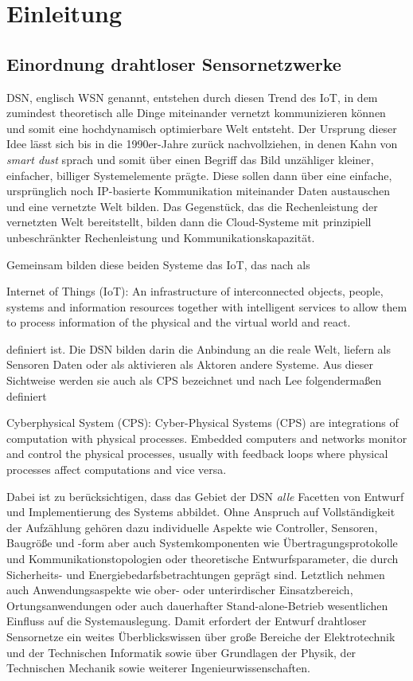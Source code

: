\thispagestyle{plain}
\chapter{Einleitung}
\section{Einordnung drahtloser Sensornetzwerke}

\ac{DSN}, englisch \ac{WSN} genannt, entstehen durch diesen Trend des \ac{IoT}, in dem zumindest theoretisch alle Dinge miteinander vernetzt kommunizieren können und somit eine hochdynamisch optimierbare Welt entsteht. Der Ursprung dieser Idee lässt sich bis in die 1990er-Jahre zurück nachvollziehen, in denen Kahn \parencite{Kahn1999} von \emph{smart dust} sprach und somit über einen Begriff das Bild unzähliger kleiner, einfacher, billiger Systemelemente prägte. Diese sollen dann über eine einfache, ursprünglich noch \ac{IP}-basierte Kommunikation miteinander Daten austauschen und eine vernetzte Welt bilden. Das Gegenstück, das die Rechenleistung der vernetzten Welt bereitstellt, bilden dann die Cloud-Systeme mit prinzipiell unbeschränkter Rechenleistung und Kommunikationskapazität.

Gemeinsam bilden diese beiden Systeme das \ac{IoT}, das nach \textcite{InternationalOrganizationforStandardization1997} als 

Internet of Things (IoT):
An infrastructure of interconnected objects, people, systems and information resources together with intelligent services to allow them to process information of the physical and the virtual world and react.

definiert ist. Die \ac{DSN} bilden darin die Anbindung an die reale Welt, liefern als Sensoren Daten oder als aktivieren als Aktoren andere Systeme. Aus dieser Sichtweise werden sie auch als \ac{CPS} bezeichnet und nach Lee \parencite{Lee2008} folgendermaßen definiert

Cyberphysical System (CPS): Cyber-Physical Systems (CPS) are integrations of computation with physical processes. Embedded computers and networks monitor and control the physical processes, usually with feedback loops where physical processes affect computations and vice versa.

Dabei ist zu berücksichtigen, dass das Gebiet der \ac{DSN} \emph{alle} Facetten von Entwurf und Implementierung des Systems abbildet. Ohne Anspruch auf Vollständigkeit der Aufzählung gehören dazu individuelle Aspekte wie Controller, Sensoren, Baugröße und -form aber auch Systemkomponenten wie Übertragungsprotokolle und Kommunikationstopologien oder theoretische Entwurfsparameter, die durch Sicherheits- und Energiebedarfsbetrachtungen geprägt sind. Letztlich nehmen auch Anwendungsaspekte wie ober- oder unterirdischer Einsatzbereich, Ortungsanwendungen oder auch dauerhafter Stand-alone-Betrieb wesentlichen Einfluss auf die Systemauslegung. Damit erfordert der Entwurf drahtloser Sensornetze ein weites Überblickswissen über große Bereiche der Elektrotechnik und der Technischen Informatik sowie über Grundlagen der Physik, der Technischen Mechanik sowie weiterer Ingenieurwissenschaften.  

